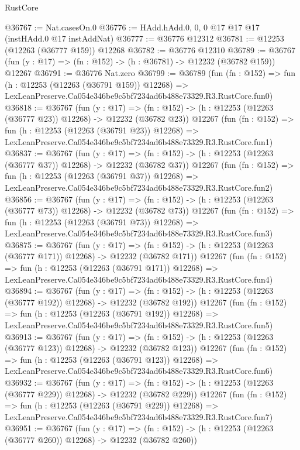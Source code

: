 \begin{lexlean}{RustCore}
\begin{coremodule}
@36767 := Nat.casesOn.{0}
@36776 := HAdd.hAdd.{0, 0, 0} @17 @17 @17 (instHAdd.{0} @17 instAddNat)
@36777 := @36776 @12312
@36781 := @12253 (@12263 (@36777 @159)) @12268
@36782 := @36776 @12310
@36789 := @36767 (fun (y : @17) => (fn : @152) -> (h : @36781) -> @12232 (@36782 @159)) @12267
@36791 := @36776 Nat.zero
@36799 := @36789
    (fun (fn : @152) =>
    fun (h : @12253 (@12263 (@36791 @159)) @12268) =>
    LexLeanPreserve.Ca054e346be9c5bf7234ad6b488e73329.R3.RustCore.fun0)
@36818 := @36767
    (fun (y : @17) =>
    (fn : @152) -> (h : @12253 (@12263 (@36777 @23)) @12268) -> @12232 (@36782 @23))
    @12267
    (fun (fn : @152) =>
    fun (h : @12253 (@12263 (@36791 @23)) @12268) =>
    LexLeanPreserve.Ca054e346be9c5bf7234ad6b488e73329.R3.RustCore.fun1)
@36837 := @36767
    (fun (y : @17) =>
    (fn : @152) -> (h : @12253 (@12263 (@36777 @37)) @12268) -> @12232 (@36782 @37))
    @12267
    (fun (fn : @152) =>
    fun (h : @12253 (@12263 (@36791 @37)) @12268) =>
    LexLeanPreserve.Ca054e346be9c5bf7234ad6b488e73329.R3.RustCore.fun2)
@36856 := @36767
    (fun (y : @17) =>
    (fn : @152) -> (h : @12253 (@12263 (@36777 @73)) @12268) -> @12232 (@36782 @73))
    @12267
    (fun (fn : @152) =>
    fun (h : @12253 (@12263 (@36791 @73)) @12268) =>
    LexLeanPreserve.Ca054e346be9c5bf7234ad6b488e73329.R3.RustCore.fun3)
@36875 := @36767
    (fun (y : @17) =>
    (fn : @152) -> (h : @12253 (@12263 (@36777 @171)) @12268) -> @12232 (@36782 @171))
    @12267
    (fun (fn : @152) =>
    fun (h : @12253 (@12263 (@36791 @171)) @12268) =>
    LexLeanPreserve.Ca054e346be9c5bf7234ad6b488e73329.R3.RustCore.fun4)
@36894 := @36767
    (fun (y : @17) =>
    (fn : @152) -> (h : @12253 (@12263 (@36777 @192)) @12268) -> @12232 (@36782 @192))
    @12267
    (fun (fn : @152) =>
    fun (h : @12253 (@12263 (@36791 @192)) @12268) =>
    LexLeanPreserve.Ca054e346be9c5bf7234ad6b488e73329.R3.RustCore.fun5)
@36913 := @36767
    (fun (y : @17) =>
    (fn : @152) -> (h : @12253 (@12263 (@36777 @123)) @12268) -> @12232 (@36782 @123))
    @12267
    (fun (fn : @152) =>
    fun (h : @12253 (@12263 (@36791 @123)) @12268) =>
    LexLeanPreserve.Ca054e346be9c5bf7234ad6b488e73329.R3.RustCore.fun6)
@36932 := @36767
    (fun (y : @17) =>
    (fn : @152) -> (h : @12253 (@12263 (@36777 @229)) @12268) -> @12232 (@36782 @229))
    @12267
    (fun (fn : @152) =>
    fun (h : @12253 (@12263 (@36791 @229)) @12268) =>
    LexLeanPreserve.Ca054e346be9c5bf7234ad6b488e73329.R3.RustCore.fun7)
@36951 := @36767
    (fun (y : @17) =>
    (fn : @152) -> (h : @12253 (@12263 (@36777 @260)) @12268) -> @12232 (@36782 @260))

\end{coremodule}
\end{lexlean}

